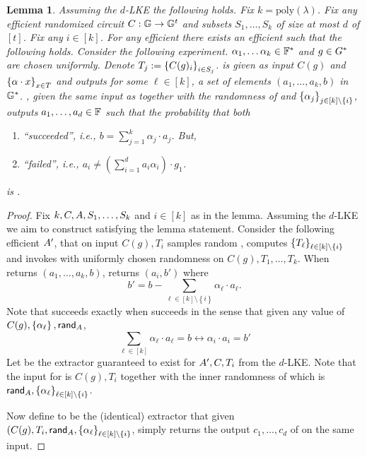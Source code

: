 \documentclass[11pt]{article}
\numberwithin{figure}{section} %
\newtheorem{lemma}[thm]{Lemma}
\newcommand{\set}[1]{\ensuremath{\left\{#1\right\}}\xspace}
\newcommand{\poly}{\ensuremath{\mathrm{poly}(\lambda)}\xspace}
\begin{document}
\begin{lemma}\label{lem:batchLKE}
Assuming the $d$-LKE the following holds. Fix $k=\poly$.
Fix any efficient randomized circuit $C:{\mathbb G} \to {\mathbb G}^{t}$ and subsets $S_1,\ldots,S_k$ of size at most $d$ of $[t]$.
Fix any $i\in [k]$.
For any efficient \adv there exists an efficient \ext such that the following holds.
Consider the following experiment.
 $\alpha_1,\ldots\alpha_k\in \mathbb F^*$ and $g\in G^*$ are chosen uniformly.
 Denote $T_j\defeq \sett{C(g)_i}{i\in S_j}$.
 \adv is given as input $C(g)$ and $\sett{\alpha\cdot x }{x\in T}$
 and outputs for some $\ell \in [k]$, a set of elements  $(a_1,\ldots, a_k,b)$ in ${\mathbb G}^*$.
   \ext, given the same input as \adv together with the randomness of \adv and $\sett{\alpha_j}{j\in [k]\setminus\set{i}}$, outputs  
 $a_1,\ldots,a_d \in \mathbb F$ such that the probability that both
   
 \begin{enumerate}
  \item \adv ``succeeded'', i.e., $b=\sum_{j=1}^k\alpha_j\cdot a_j$. But,
  \item \ext ``failed'', i.e., $a_i \neq (\sum_{i=1}^d a_i \alpha_i)\cdot g_1$.
   \end{enumerate}
is \neg.
\end{lemma}
\begin{proof}
 Fix $k,C,A, S_1,\ldots,S_k$ and $i\in [k]$ as in the lemma. Assuming the $d$-LKE we aim to construct \ext satisfying the lemma statement. Consider the following efficient $A'$, that on input $C(g), T_i$ samples random \sett{\alpha_\ell\in \Fstar}{\ell\in [k]\setminus\set{i}},  computes $\sett{T_\ell}{\ell\in [k]\setminus\set{i}}$ and invokes \adv with
 uniformly chosen randomness \randadv on $C(g),T_1,\ldots,T_k$.
 When \adv returns $(a_1,\ldots,a_k,b)$, \advprime returns $(a_i,b')$ where
 \[b' = b-\sum_{\ell\in [k]\setminus\set{i}} \alpha_\ell\cdot a_\ell.\]
 Note that \adv succeeds exactly when \advprime succeeds in the sense that
 given any value of $C(g),\set{\alpha_\ell},\randadv$,
 \[\sum_{\ell\in [k]} \alpha_\ell\cdot a_\ell  = b \leftrightarrow \alpha_i\cdot a_i = b'\]
 Let \extprime be the extractor guaranteed to exist for $A',C,T_i$ from the $d$-LKE.
 Note that the input for \extprime is $C(g),T_i$ together with the inner randomness of \advprime which is 
 $\randadv,\sett{\alpha_\ell}{\ell\in [k]\setminus\set{i}}$.
 
 Now define \ext to be the (identical) extractor that given 
 $(C(g),T_i,\randadv,\sett{\alpha_\ell}{\ell\in [k] \setminus\set{i}}$,
 simply returns the output $c_1,\ldots,c_d$ of \extprime on the same input.
\end{proof}
\end{document}
